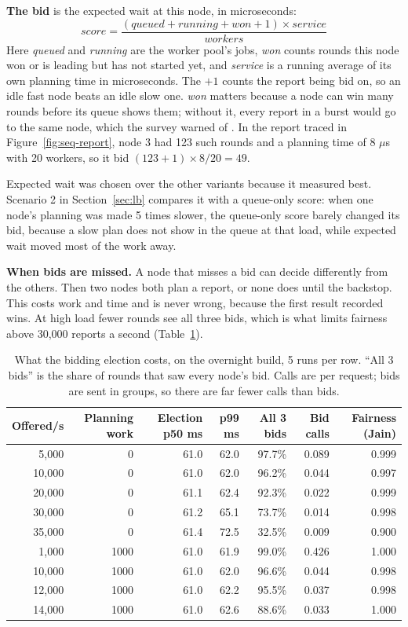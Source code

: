 \textbf{The bid} is the expected wait at this node, in microseconds:
\[
\mathit{score} = \frac{(\mathit{queued} + \mathit{running} + \mathit{won} + 1) \times \mathit{service}}{\mathit{workers}}
\]
Here \emph{queued} and \emph{running} are the worker pool's jobs, \emph{won} counts rounds this node won or is leading but has not started yet, and \emph{service} is a running average of its own planning time in microseconds. The $+1$ counts the report being bid on, so an idle fast node beats an idle slow one. \emph{won} matters because a node can win many rounds before its queue shows them; without it, every report in a burst would go to the same node, which the survey warned of \cite{survey}. In the report traced in Figure~\ref{fig:seq-report}, node 3 had 123 such rounds and a planning time of 8 $\mu$s with 20 workers, so it bid $(123+1) \times 8 / 20 = 49$.

Expected wait was chosen over the other variants because it measured best. Scenario 2 in Section~\ref{sec:lb} compares it with a queue-only score: when one node's planning was made 5 times slower, the queue-only score barely changed its bid, because a slow plan does not show in the queue at that load, while expected wait moved most of the work away.

\textbf{When bids are missed.} A node that misses a bid can decide differently from the others. Then two nodes both plan a report, or none does until the backstop. This costs work and time and is never wrong, because the first result recorded wins. At high load fewer rounds see all three bids, which is what limits fairness above 30,000 reports a second (Table~\ref{tab:elcost}).

\begin{table}[!htb]
\centering\small
\caption{What the bidding election costs, on the overnight build, 5 runs per row. ``All 3 bids'' is the share of rounds that saw every node's bid. Calls are per request; bids are sent in groups, so there are far fewer calls than bids.}
\label{tab:elcost}
\begin{tabular}{@{}rrrrrrr@{}}
\toprule
Offered/s & Planning work & Election p50 ms & p99 ms & All 3 bids & Bid calls & Fairness (Jain) \\
\midrule
5,000 & 0 & 61.0 & 62.0 & 97.7\% & 0.089 & 0.999 \\
10,000 & 0 & 61.0 & 62.0 & 96.2\% & 0.044 & 0.997 \\
20,000 & 0 & 61.1 & 62.4 & 92.3\% & 0.022 & 0.999 \\
30,000 & 0 & 61.2 & 65.1 & 73.7\% & 0.014 & 0.998 \\
35,000 & 0 & 61.4 & 72.5 & 32.5\% & 0.009 & 0.900 \\
1,000 & 1000 & 61.0 & 61.9 & 99.0\% & 0.426 & 1.000 \\
10,000 & 1000 & 61.0 & 62.0 & 96.6\% & 0.044 & 0.998 \\
12,000 & 1000 & 61.0 & 62.2 & 95.5\% & 0.037 & 0.998 \\
14,000 & 1000 & 61.0 & 62.6 & 88.6\% & 0.033 & 1.000 \\
\bottomrule
\end{tabular}
\end{table}


